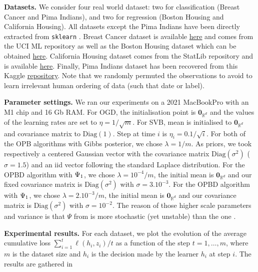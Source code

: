 \textbf{Datasets.} We consider four real world dataset: two for classification (Breast Cancer and Pima Indians), and two for regression (Boston Housing and California Housing). All datasets except the Pima Indians have been directly extracted from \texttt{sklearn} \citep{pedregosa2011scikit}.
Breast Cancer dataset \citep{street1993nuclear} is available \href{https://archive.ics.uci.edu/ml/datasets/Breast+Cancer+Wisconsin+(Diagnostic)}{here} and comes from the UCI ML repository  as well as the Boston Housing dataset \citep{belsley2005regression} which can be obtained \href{https://archive.ics.uci.edu/ml/machine-learning-databases/housing/}{here}. California Housing dataset \citep{pace1997sparse} comes from the StatLib repository and is available \href{https://www.dcc.fc.up.pt/~ltorgo/Regression/cal_housing.html}{here}.
Finally, Pima Indians dataset \citep{smith1988using} has been recovered from this Kaggle \href{https://www.kaggle.com/datasets/uciml/pima-indians-diabetes-database}{repository}.  Note that we randomly permuted the observations to avoid to learn irrelevant human ordering of data (such that date or label).


\textbf{Parameter settings.}
 We ran our experiments on a 2021 MacBookPro with an M1 chip and 16 Gb RAM.
 For OGD, the initialisation point is $\mathbf{0}_{\mathbb{R}^d}$ and the values of the learning rates are set to $\eta=1 / \sqrt{m}$.
 For SVB, mean is initialised to $\mathbf{0}_{\mathbb{R}^d}$ and covariance matrix to $\text{Diag}(1)$. Step at time $i$ is $\eta_i= 0.1/\sqrt{i}$.
 For both of the OPB algorithms with Gibbs posterior, we chose $\lambda= 1/m$. As priors, we took respectively a centered Gaussian vector with the covariance matrix $\text{Diag}(\sigma^2)$ ($\sigma=1.5$) and an iid vector following the standard Laplace distribution.
 For the OPBD algorithm with $\Psi_{\normalfont1}$, we chose $\lambda = 10^{-4}/m$, the initial mean is $\mathbf{0}_{\mathbb{R}^d}$ and
 our fixed covariance matrix is $\text{Diag}(\sigma^2)$ with $\sigma= 3.10^{-3}$.
 For the OPBD algorithm with $\Psi_{\normalfont1}$, we chose $\lambda = 2.10^{-3}/m$, the initial mean is $\mathbf{0}_{\mathbb{R}^d}$ and our covariance matrix is $\text{Diag}(\sigma^2)$ with $\sigma= 10^{-2}$.  The reason of those higher scale parameters and variance is that  $\Psi$ from \citet{rivasplata2020pac} is more stochastic (yet unstable) than the one \citet{viallard2023general}.

 \textbf{Experimental results.}
 For each dataset, we plot the evolution of the average cumulative loss $\sum_{i=1}^{t} \ell\left(h_{i},z_i\right) / t$ as a function of the step $t=1, \ldots, m$, where $m$ is the dataset size and $h_{i}$ is the decision made by the learner $h_i$ at step $i$. The results are gathered in 

